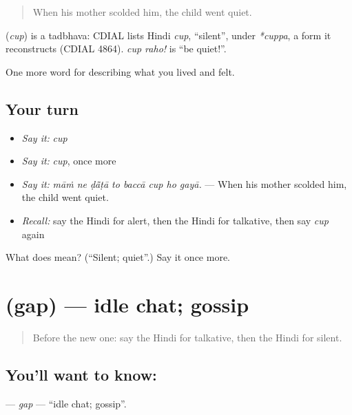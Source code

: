 \begin{quote}
When his mother scolded him, the child went quiet.
\end{quote}

\begin{cousinweb}
\textbf{} (\emph{cup}) is a tadbhava: CDIAL lists Hindi \emph{cup}, \textquotedblleft{}silent\textquotedblright{}, under \emph{*cuppa}, a form it reconstructs (CDIAL 4864). \emph{cup raho!} is \textquotedblleft{}be quiet!\textquotedblright{}.
\end{cousinweb}

\begin{grammarlens}[title={What you've built}]
One more word for describing what you lived and felt.
\end{grammarlens}

\subsection*{Your turn}
\begin{itemize}
\raggedright
  \item \emph{Say it:} \emph{cup}
  \item \emph{Say it:} \emph{cup}, once more
  \item \emph{Say it:} \emph{māṁ ne ḍā̃ṭā to baccā cup ho gayā.} — When his mother scolded him, the child went quiet.
  \item \emph{Recall:} say the Hindi for alert, then the Hindi for talkative, then say \emph{cup} again
\end{itemize}

\begin{tcolorbox}[breakable,colback=teal!4,colframe=teal!35!black,title={Before you move on}]
What does  mean? (\textquotedblleft{}Silent; quiet\textquotedblright{}.) Say it once more.
\end{tcolorbox}
\section[\texorpdfstring{\hi{गप} (gap)}{गप (gap)}]{ (gap) — idle chat; gossip}

\label{lesson:HI-C473-gap}



\begin{quote}
Before the new one: say the Hindi for talkative, then the Hindi for silent.
\end{quote}

\subsection*{You'll want to know: }
\textbf{} — \emph{gap} — \textquotedblleft{}idle chat; gossip\textquotedblright{}.

